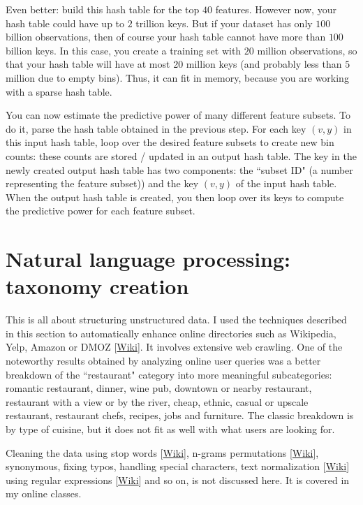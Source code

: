 \documentclass[oneside,10pt]{book}
\begin{document}
Even better: build this hash table for the top $40$ features. However now, your hash table could have up to $2$ trillion keys. But if your dataset has only $100$ billion observations, then of course your hash table cannot have more than $100$ billion keys. In this case,  you create a training set with $20$ million observations, so that your hash table will have at most 20 million keys (and probably less than $5$ million due to empty bins). Thus, it can fit in memory, because
 you are working with a \textcolor{index}{sparse hash table}.



You can now estimate the predictive power of many different feature subsets. To do it, parse the hash table obtained in the previous step. For each  
key $(v,y)$ in this input  hash table, loop over the desired feature subsets to create new bin counts: these counts are stored / updated in an output hash table. The key in the newly created output hash table has two components: the ``subset ID" (a number representing the feature subset)) and 
 the key $(v, y)$ of the input hash table.  
When the output hash table is created, you then loop over its keys to compute the predictive power for each feature subset. 

\section{Natural language processing: taxonomy creation}\label{nlp21}

This is all about structuring unstructured data. I used the techniques described in this section to automatically enhance online directories such as Wikipedia, Yelp, Amazon or DMOZ [\href{https://en.wikipedia.org/wiki/DMOZ}{Wiki}]. 
It involves extensive web crawling. One of the noteworthy results obtained  by analyzing online user queries was a better breakdown of the ``restaurant" category into more meaningful subcategories: romantic restaurant, dinner, wine pub, downtown or nearby restaurant, restaurant with a view or by the river, cheap, ethnic, casual or upscale restaurant, restaurant chefs, recipes, jobs and furniture. The classic breakdown is by type of cuisine, but it does not fit as well with what users are looking for. 

Cleaning the data using \textcolor{index}{stop words} [\href{https://en.wikipedia.org/wiki/Stop_word}{Wiki}], \textcolor{index}{n-grams} 
 permutations [\href{https://en.wikipedia.org/wiki/N-gram}{Wiki}], synonymous, fixing typos, handling special characters,  
 \textcolor{index}{text normalization} [\href{https://en.wikipedia.org/wiki/Text_normalization}{Wiki}] using \textcolor{index}{regular expressions} [\href{https://en.wikipedia.org/wiki/Regular_expression}{Wiki}] and so on, is not discussed here. It is covered in my online classes. 
\end{document}
